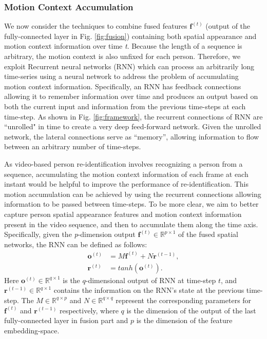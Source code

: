 \documentclass[journal]{IEEEtran}
\begin{document}
\subsubsection{Motion Context Accumulation}\label{mo_acc}
We now consider the techniques to combine fused features  $\textbf{f}^{(t)}$ (output of the fully-connected layer in Fig. \ref{fig:fusion}) containing both spatial appearance and motion context information over time \textit{t}. Because the length of a sequence is arbitrary, the motion context is also unfixed for each person. Therefore, we exploit  Recurrent neural networks (RNN) which can process an arbitrarily long time-series using a neural network to address the problem of accumulating motion context information. Specifically, an RNN has feedback connections allowing it to remember information over time and produces an output based on both the current input and information from the previous time-steps at each time-step.  As shown in Fig. \ref{fig:framework},  the recurrent connections of RNN are ``unrolled"  in time to create a very deep feed-forward network.  Given the unrolled network, the lateral connections serve as ``memory'', allowing information to flow between an arbitrary number of time-steps. 

As video-based person re-identification involves recognizing a person from a sequence, accumulating the motion context information of each frame at each instant would be helpful to improve the performance of re-identification. This motion accumulation can be achieved by using the recurrent connections allowing information to be passed between time-steps. To be more clear,  we aim to better capture person spatial appearance features and motion context information present in the video sequence, and then to accumulate them along the time axis. Specifically, given the \textit{p}-dimension output $\textbf{f}^{(t)} \in \mathbb{R}^{p \times 1}$ of the fused spatial networks, the RNN can be defined as follows:
\begin{align}\label{RNN}
\textbf{o}^{(t)}&= M\textbf{f}^{(t)} + N\textbf{r}^{(t-1)},\\
\textbf{r}^{(t)}&= tanh(\textbf{o}^{(t)}).
\end{align}
Here $\textbf{o}^{(t)} \in \mathbb{R}^{q \times 1}  $ is the $q$-dimensional output of RNN at time-step $t$, and $\textbf{r}^{(t-1)} \in \mathbb{R}^{q \times 1}  $  contains the information on the RNN's state at the previous time-step. The $M\in \mathbb{R}^{q \times p}$ and $N\in \mathbb{R}^{q \times q}$ represent the corresponding parameters for $\textbf{f}^{(t)}$ and $\textbf{r}^{(t-1)}$ respectively, where $q$ is the dimension of the output of the last fully-connected layer in fusion part and $p$ is the dimension of the feature embedding-space. 
\end{document}
